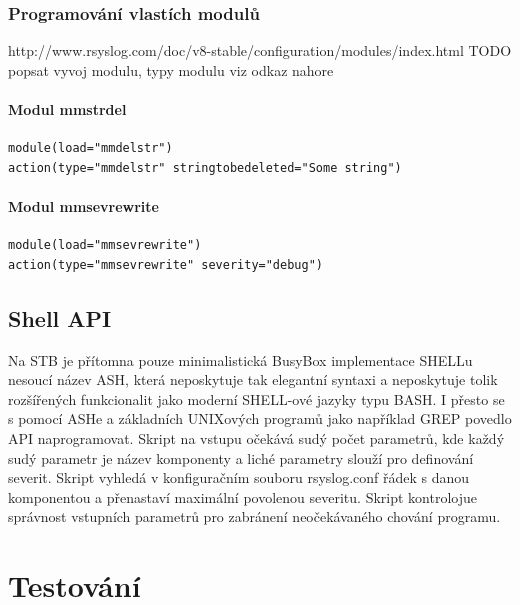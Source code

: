 \documentclass[thesis=B,czech]{FITthesis}[2012/06/26]
\begin{document}
\subsection{Programování vlastích modulů}

http://www.rsyslog.com/doc/v8-stable/configuration/modules/index.html
TODO popsat vyvoj modulu, typy modulu viz odkaz nahore



\subsubsection{Modul mmstrdel}

\begin{lstlisting}
module(load="mmdelstr") 
action(type="mmdelstr" stringtobedeleted="Some string")
\end{lstlisting}


\subsubsection{Modul mmsevrewrite}

\begin{lstlisting}
module(load="mmsevrewrite")
action(type="mmsevrewrite" severity="debug")
\end{lstlisting}


\section{Shell API}
Na STB je přítomna pouze minimalistická BusyBox implementace SHELLu nesoucí název ASH, která neposkytuje tak elegantní syntaxi a neposkytuje tolik rozšířených funkcionalit jako moderní SHELL-ové jazyky typu BASH. I přesto se s pomocí ASHe a základních UNIXových programů jako například GREP povedlo API naprogramovat.
Skript na vstupu očekává sudý počet parametrů, kde každý sudý parametr je název komponenty a liché parametry slouží pro definování severit.
Skript vyhledá v konfiguračním souboru rsyslog.conf řádek s danou komponentou a přenastaví maximální povolenou severitu. Skript kontrolojue správnost vstupních parametrů pro zabránení neočekávaného chování programu.




\chapter{Testování}
\end{document}
